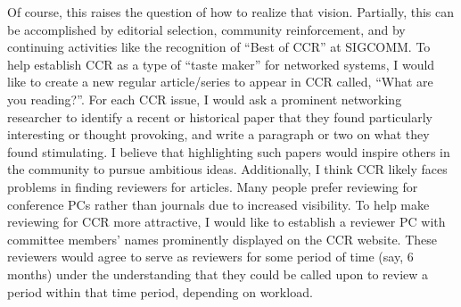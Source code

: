 \documentclass[11pt]{article}
\begin{document}
Of course, this raises the question of how to realize that vision. Partially, this can be accomplished by editorial selection, community reinforcement, and by continuing activities like the recognition of “Best of CCR” at SIGCOMM. To help establish CCR as a type of  “taste maker” for networked systems, I would like to create a new regular article/series to appear in CCR called, “What are you reading?”. For each CCR issue, I would ask a prominent networking researcher to identify a recent or historical paper that they found particularly interesting or thought provoking, and write a paragraph or two on what they found stimulating. I believe that highlighting such papers would inspire others in the community to pursue ambitious ideas. Additionally, I think CCR likely faces problems in finding reviewers for articles. Many people prefer reviewing for conference PCs rather than journals due to increased visibility. To help make reviewing for CCR more attractive, I would like to establish a reviewer PC with committee members’ names prominently displayed on the CCR website. These reviewers would agree to serve as reviewers for some period of time (say, 6 months) under the understanding that they could be called upon to review a period within that time period, depending on workload. 
\end{document}
